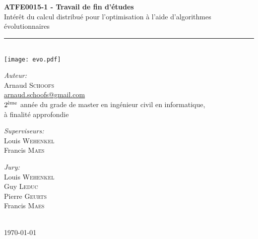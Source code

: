 \documentclass[a4paper, 11pt]{article}
\newcommand{\HRule}{\rule{\linewidth}{0.5mm}}
\begin{document}
\begin{titlepage}

\begin{center}

\begin{figure}
\centering
\mbox{
\hspace{6cm}
}
\end{figure}

\ \\[1cm]

\textbf{\large ATFE0015-1 - Travail de fin d'études}\\[1,5cm]




\huge Intérêt du calcul distribué pour l'optimisation à l'aide d'algorithmes évolutionnaires
\HRule \\[0.4cm]
\texttt{[image: evo.pdf]}


\vfill

\large
\emph{Auteur:}\\
Arnaud \textsc{Schoofs}\\
\href{mailto:arnaud.schoofs@gmail.com}{arnaud.schoofs@gmail.com}\\
\large $2^{\textnormal{ème}}$ année du grade de master en ingénieur civil en informatique,\\
à finalité approfondie \\[1.5cm]

\begin{minipage}{0.4\textwidth}
\begin{flushleft} \large
\emph{Superviseurs:}\\
Louis \textsc{Wehenkel}\\
Francis \textsc{Maes}
\end{flushleft}
\end{minipage}
\begin{minipage}{0.4\textwidth}
\begin{flushright} \large
\emph{Jury:} \\
Louis \textsc{Wehenkel}\\
Guy \textsc{Leduc}\\
Pierre \textsc{Geurts}\\
Francis \textsc{Maes}
\end{flushright}
\end{minipage}

\ \\[1.5cm]

{\large \today}

\end{center}
\end{titlepage}
\end{document}
